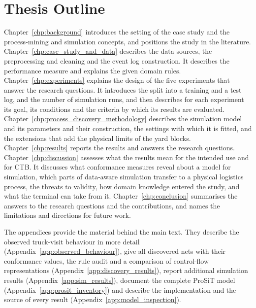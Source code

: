 \section{Thesis Outline}
\label{sec:thesis_outline}

Chapter~\ref{chp:background} introduces the setting of the case study and the
process-mining and simulation concepts, and positions the study in the literature.
Chapter~\ref{chp:case_study_and_data} describes the data sources, the preprocessing and cleaning and
the event log construction. It describes the performance measure and explains the given domain rules. 
Chapter~\ref{chp:experiments} explains the design of the five experiments that answer
the research questions. It introduces the split into a training and a test log, and the number of simulation runs, and then describes for each
experiment its goal, its conditions and the criteria by which its results are evaluated.
Chapter~\ref{chp:process_discovery_methodology} describes the simulation model and its parameters and their construction, the
settings with which it is fitted, and the extensions that add the physical limits of the yard blocks.
Chapter~\ref{chp:results} reports the results and answers the research questions.
Chapter~\ref{chp:discussion} assesses what the results mean for the intended use and
for CTB. It discusses what conformance measures reveal about a model for simulation,
which parts of data-aware simulation transfer to a physical logistics process, the
threats to validity, how domain knowledge entered the study, and what the terminal can
take from it. Chapter~\ref{chp:conclusion} summarises the answers to the research
questions and the contributions, and names the limitations and directions for future
work.

The appendices provide the material behind the main text. They describe the observed
truck-visit behaviour in more detail (Appendix~\ref{app:observed_behaviour}), give all
discovered nets with their conformance values, the rule audit and a comparison of
control-flow representations (Appendix~\ref{app:discovery_results}), report
additional simulation results
(Appendix~\ref{app:sim_results}), document the complete ProSiT model
(Appendix~\ref{app:prosit_inventory}) and describe the implementation and the source of every result
(Appendix~\ref{app:model_inspection}).
